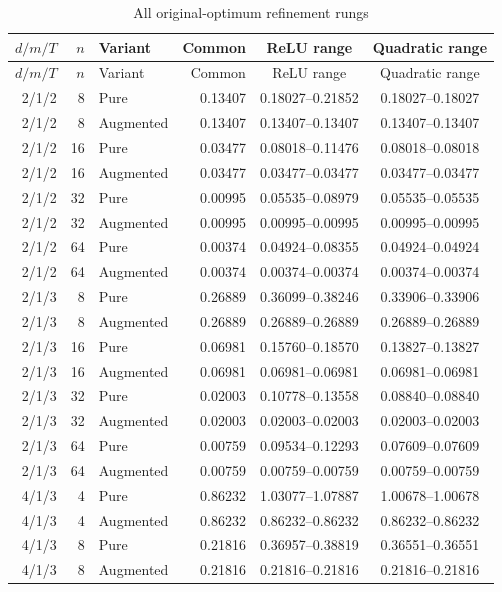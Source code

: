 {\small\setlength{\tabcolsep}{3pt}
\begin{longtable}{rrlrcc}
\caption{All original-optimum refinement rungs}\label{tab:rungs62} \\
\hline
$d/m/T$ & $n$ & Variant & Common & ReLU range & Quadratic range \\
\hline\endfirsthead
\hline
$d/m/T$ & $n$ & Variant & Common & ReLU range & Quadratic range \\
\hline\endhead
2/1/2 & 8 & Pure & 0.13407 & 0.18027--0.21852 & 0.18027--0.18027 \\
2/1/2 & 8 & Augmented & 0.13407 & 0.13407--0.13407 & 0.13407--0.13407 \\
2/1/2 & 16 & Pure & 0.03477 & 0.08018--0.11476 & 0.08018--0.08018 \\
2/1/2 & 16 & Augmented & 0.03477 & 0.03477--0.03477 & 0.03477--0.03477 \\
2/1/2 & 32 & Pure & 0.00995 & 0.05535--0.08979 & 0.05535--0.05535 \\
2/1/2 & 32 & Augmented & 0.00995 & 0.00995--0.00995 & 0.00995--0.00995 \\
2/1/2 & 64 & Pure & 0.00374 & 0.04924--0.08355 & 0.04924--0.04924 \\
2/1/2 & 64 & Augmented & 0.00374 & 0.00374--0.00374 & 0.00374--0.00374 \\
2/1/3 & 8 & Pure & 0.26889 & 0.36099--0.38246 & 0.33906--0.33906 \\
2/1/3 & 8 & Augmented & 0.26889 & 0.26889--0.26889 & 0.26889--0.26889 \\
2/1/3 & 16 & Pure & 0.06981 & 0.15760--0.18570 & 0.13827--0.13827 \\
2/1/3 & 16 & Augmented & 0.06981 & 0.06981--0.06981 & 0.06981--0.06981 \\
2/1/3 & 32 & Pure & 0.02003 & 0.10778--0.13558 & 0.08840--0.08840 \\
2/1/3 & 32 & Augmented & 0.02003 & 0.02003--0.02003 & 0.02003--0.02003 \\
2/1/3 & 64 & Pure & 0.00759 & 0.09534--0.12293 & 0.07609--0.07609 \\
2/1/3 & 64 & Augmented & 0.00759 & 0.00759--0.00759 & 0.00759--0.00759 \\
4/1/3 & 4 & Pure & 0.86232 & 1.03077--1.07887 & 1.00678--1.00678 \\
4/1/3 & 4 & Augmented & 0.86232 & 0.86232--0.86232 & 0.86232--0.86232 \\
4/1/3 & 8 & Pure & 0.21816 & 0.36957--0.38819 & 0.36551--0.36551 \\
4/1/3 & 8 & Augmented & 0.21816 & 0.21816--0.21816 & 0.21816--0.21816 \\

\end{longtable}}
